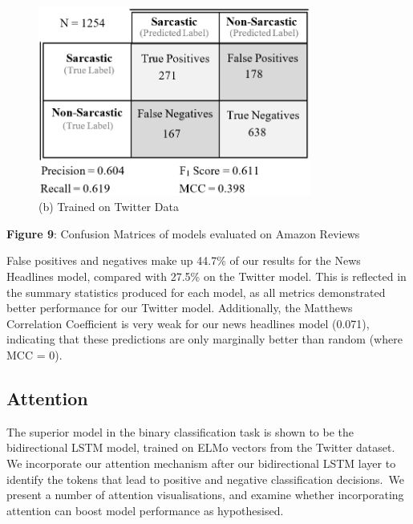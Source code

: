 \documentclass[12pt,a4paper]{article}
\begin{document}
\begin{minipage}{0.45\textwidth}
	\vspace{-5pt}\begin{figure}[H]
		\begin{center}
			\includegraphics[width=0.8\textwidth]{Images/cm1.png}\\
			(b) Trained on Twitter Data\\
		\end{center}
	\end{figure}
\end{minipage}\vspace{-17pt}

\begin{center}
	\textbf{Figure 9}: Confusion Matrices of models evaluated on Amazon Reviews\vspace{-8pt}
\end{center}

\noindent False positives and negatives make up 44.7\% of our results for the News Headlines model, compared with 27.5\% on the Twitter model. This is reflected in the summary statistics produced for each model, as all metrics demonstrated better performance for our Twitter model. Additionally, the Matthews Correlation Coefficient is very weak for our news headlines model (0.071), indicating that these predictions are only marginally better than random (where MCC = 0).

\subsection{Attention}\vspace{-5pt}
\noindent The superior model in the binary classification task is shown to be the bidirectional LSTM model, trained on ELMo vectors from the Twitter dataset. We incorporate our attention mechanism after our bidirectional LSTM layer to identify the tokens that lead to positive and negative classification decisions.\ We present a number of attention visualisations, and examine whether incorporating attention can boost model performance as hypothesised.\\\vspace{-5pt}
\end{document}
